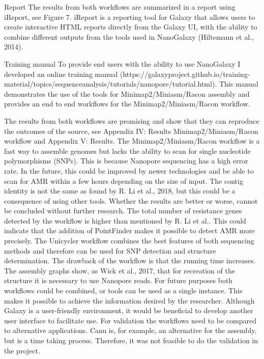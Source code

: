 \documentclass[a4paper,num-refs]{oup-contemporary}
\begin{document}
Report
The results from both workflows are summarized in a report using iReport, see Figure 7. iReport is a
reporting tool for Galaxy that allows users to create interactive HTML reports directly from the
Galaxy UI, with the ability to combine different outputs from the tools used in NanoGalaxy
(Hiltemann et al., 2014).

Training manual
To provide end users with the ability to use NanoGalaxy I developed an online training manual
(https://galaxyproject.github.io/training-material/topics/sequenceanalysis/tutorials/nanopore/tutorial.html). This manual demonstrates the use of the tools for
Minimap2/Miniasm/Racon assembly and provides an end to end workflows for the
Minimap2/Miniasm/Racon workflow.

The results from both workflows are promising and show that they can reproduce the outcomes of the source, see Appendix IV: Results Minimap2/Miniasm/Racon workflow and Appendix V: Results. The Minimap2/Miniasm/Racon workflow is a fast way to assemble genomes but lacks the ability to
scan for single nucleotide polymorphisms (SNPs). This is because Nanopore sequencing has a high error rate. In the future, this could be improved by newer technologies and be able to scan for AMR within a few hours depending on the size of input. The contig identity is not the same as found by R.
Li et al., 2018, but this could be a consequence of using other tools. Whether the results are better or worse, cannot be concluded without further research. The total number of resistance genes detected by the workflow is higher than mentioned by R. Li et al.. This could indicate that the addition of PointFinder makes it possible to detect AMR more precisely. The Unicycler workflow combines the best features of both sequencing methods and therefore can be used for SNP detection and structure determination. The drawback of the workflow is that the running time
increases. The assembly graphs show, as Wick et al., 2017, that for recreation of the structure it is necessary to use Nanopore reads. For future purposes both workflows could be combined, or tools can be used as a single instance. This makes it possible to achieve the information desired by the researcher. Although Galaxy is a user-friendly environment, it would be beneficial to develop another user interface to facilitate use. For validation the workflows need to be compared to alternative applications. Canu is, for example, an alternative for the assembly, but is a time taking
process. Therefore, it was not feasible to do the validation in the project.
\end{document}
